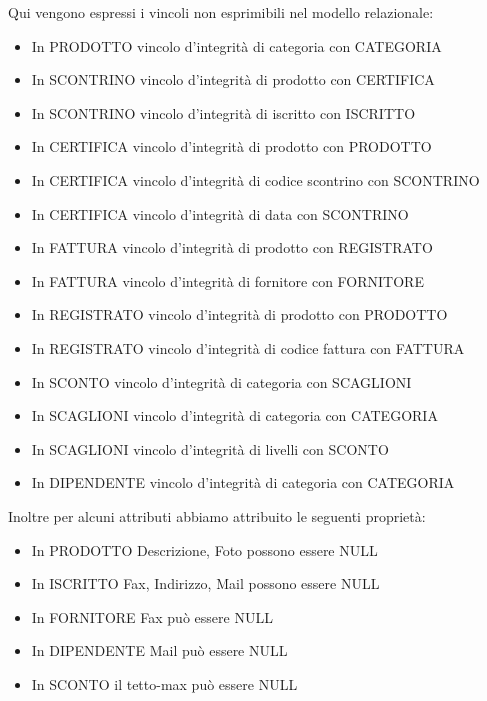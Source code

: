 Qui vengono espressi i vincoli non esprimibili nel modello relazionale:
\begin{itemize}
\item In PRODOTTO vincolo d'integrit\`a di categoria con CATEGORIA
\item In SCONTRINO vincolo d'integrit\`a di prodotto con CERTIFICA
\item In SCONTRINO vincolo d'integrit\`a di iscritto con ISCRITTO
\item In CERTIFICA vincolo d'integrit\`a di prodotto con PRODOTTO
\item In CERTIFICA vincolo d'integrit\`a di codice scontrino con SCONTRINO
\item In CERTIFICA vincolo d'integrit\`a di data con SCONTRINO
\item In FATTURA vincolo d'integrit\`a di prodotto con REGISTRATO
\item In FATTURA vincolo d'integrit\`a di fornitore con FORNITORE
\item In REGISTRATO vincolo d'integrit\`a di prodotto con PRODOTTO
\item In REGISTRATO vincolo d'integrit\`a di codice fattura con FATTURA
\item In SCONTO vincolo d'integrit\`a di categoria con SCAGLIONI
\item In SCAGLIONI vincolo d'integrit\`a di categoria con CATEGORIA
\item In SCAGLIONI vincolo d'integrit\`a di livelli con SCONTO
\item In DIPENDENTE vincolo d'integrit\`a di categoria con CATEGORIA \\

\end{itemize}

Inoltre per alcuni attributi abbiamo attribuito le seguenti propriet\`a:
\begin{itemize}
\item In PRODOTTO Descrizione, Foto possono essere NULL
\item In ISCRITTO Fax, Indirizzo, Mail possono essere NULL
\item In FORNITORE Fax pu\`o essere NULL
\item In DIPENDENTE Mail pu\`o essere NULL
\item In SCONTO il tetto-max pu\`o essere NULL

\end{itemize}

